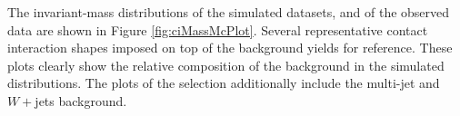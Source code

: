The invariant-mass distributions of the simulated datasets, and of the observed data are shown in Figure \ref{fig:ciMassMcPlot}.
Several representative contact interaction shapes imposed on top of the background yields for reference.
These plots clearly show the relative composition of the background in the simulated distributions.
The plots of the \ee selection additionally include the multi-jet and $W+$jets background.

